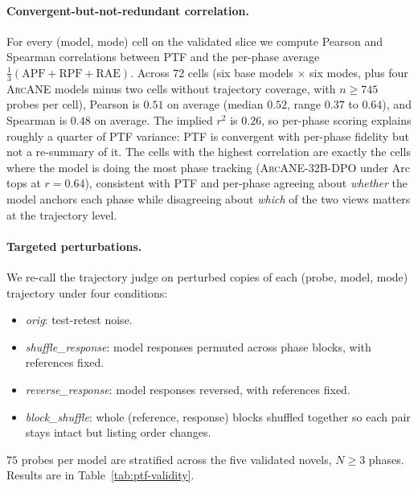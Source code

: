 \documentclass[11pt]{article}
\newcommand{\ours}{\textsc{ArcANE}}
\begin{document}
\paragraph{Convergent-but-not-redundant correlation.} For every (model, mode) cell on the validated slice we compute Pearson and Spearman correlations between PTF and the per-phase average $\frac{1}{3}(\text{APF}+\text{RPF}+\text{RAE})$. Across $72$ cells (six base models $\times$ six modes, plus four \ours{} models minus two cells without trajectory coverage, with $n\ge 745$ probes per cell), Pearson is $0.51$ on average (median $0.52$, range $0.37$ to $0.64$), and Spearman is $0.48$ on average. The implied $r^2$ is $0.26$, so per-phase scoring explains roughly a quarter of PTF variance: PTF is convergent with per-phase fidelity but not a re-summary of it. The cells with the highest correlation are exactly the cells where the model is doing the most phase tracking (\ours{}-32B-DPO under Arc tops at $r{=}0.64$), consistent with PTF and per-phase agreeing about \emph{whether} the model anchors each phase while disagreeing about \emph{which} of the two views matters at the trajectory level.

\paragraph{Targeted perturbations.} We re-call the trajectory judge on perturbed copies of each (probe, model, mode) trajectory under four conditions:
\begin{itemize}
\setlength{\itemsep}{1pt}
\item \emph{orig}: test-retest noise.
\item \emph{shuffle\_response}: model responses permuted across phase blocks, with references fixed.
\item \emph{reverse\_response}: model responses reversed, with references fixed.
\item \emph{block\_shuffle}: whole (reference, response) blocks shuffled together so each pair stays intact but listing order changes.
\end{itemize}
$75$ probes per model are stratified across the five validated novels, $N{\geq}3$ phases. Results are in Table~\ref{tab:ptf-validity}.
\end{document}
